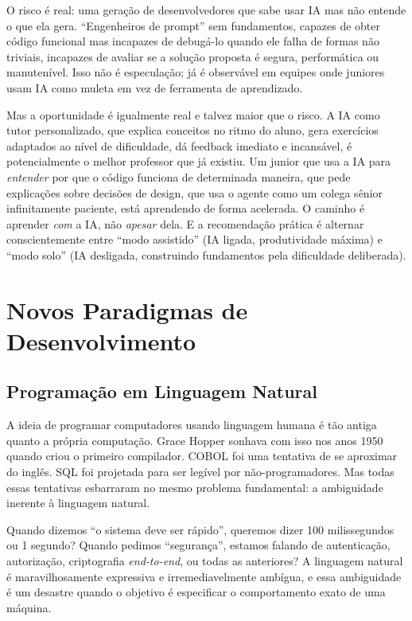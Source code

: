 O risco é real: uma geração de desenvolvedores que sabe usar IA mas não entende o que ela gera. ``Engenheiros de prompt'' sem fundamentos, capazes de obter código funcional mas incapazes de debugá-lo quando ele falha de formas não triviais, incapazes de avaliar se a solução proposta é segura, performática ou manutenível. Isso não é especulação; já é observável em equipes onde juniores usam IA como muleta em vez de ferramenta de aprendizado.

Mas a oportunidade é igualmente real e talvez maior que o risco. A IA como tutor personalizado, que explica conceitos no ritmo do aluno, gera exercícios adaptados ao nível de dificuldade, dá feedback imediato e incansável, é potencialmente o melhor professor que já existiu. Um junior que usa a IA para \textit{entender} por que o código funciona de determinada maneira, que pede explicações sobre decisões de design, que usa o agente como um colega sênior infinitamente paciente, está aprendendo de forma acelerada. O caminho é aprender \textit{com} a IA, não \textit{apesar} dela. E a recomendação prática é alternar conscientemente entre ``modo assistido'' (IA ligada, produtividade máxima) e ``modo solo'' (IA desligada, construindo fundamentos pela dificuldade deliberada).

\section{Novos Paradigmas de Desenvolvimento}

\subsection{Programação em Linguagem Natural}

A ideia de programar computadores usando linguagem humana é tão antiga quanto a própria computação. Grace Hopper sonhava com isso nos anos 1950 quando criou o primeiro compilador. COBOL foi uma tentativa de se aproximar do inglês. SQL foi projetada para ser legível por não-programadores. Mas todas essas tentativas esbarraram no mesmo problema fundamental: a ambiguidade inerente à linguagem natural.

Quando dizemos ``o sistema deve ser rápido'', queremos dizer 100 milissegundos ou 1 segundo? Quando pedimos ``segurança'', estamos falando de autenticação, autorização, criptografia \textit{end-to-end}, ou todas as anteriores? A linguagem natural é maravilhosamente expressiva e irremediavelmente ambígua, e essa ambiguidade é um desastre quando o objetivo é especificar o comportamento exato de uma máquina.

